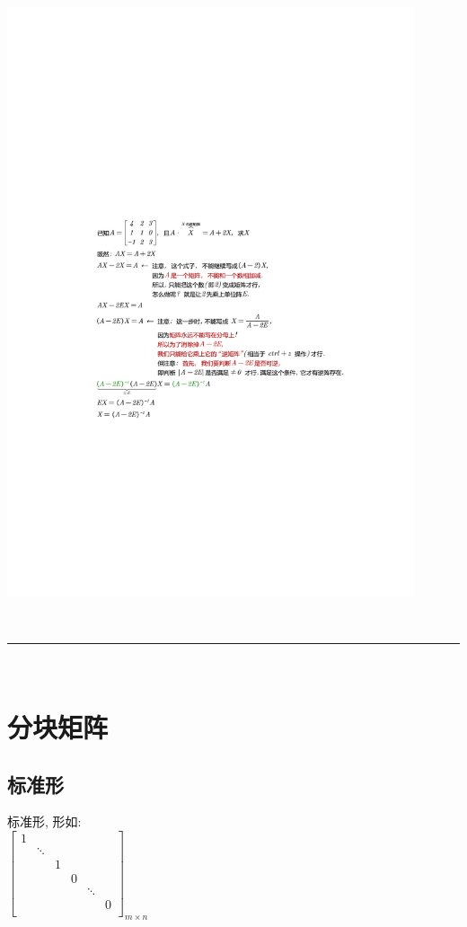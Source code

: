 \documentclass[UTF8]{ctexart}
\begin{document}
	
	\begin{myEnvSample}
\includegraphics[width=0.9\textwidth]{img/0028.pdf}\\
	\end{myEnvSample}


~\\
\hrule
~\\

\section{分块矩阵}

\subsection{标准形}

标准形, 形如: \\
$
\left[ \begin{matrix}
	1&		&		&		&		&		\\
	&		\ddots&		&		&		&		\\
	&		&		1&		&		&		\\
	&		&		&		0&		&		\\
	&		&		&		&		\ddots&		\\
	&		&		&		&		&		0\\
\end{matrix} \right]_{m×n} 
$ \\
\end{document}
